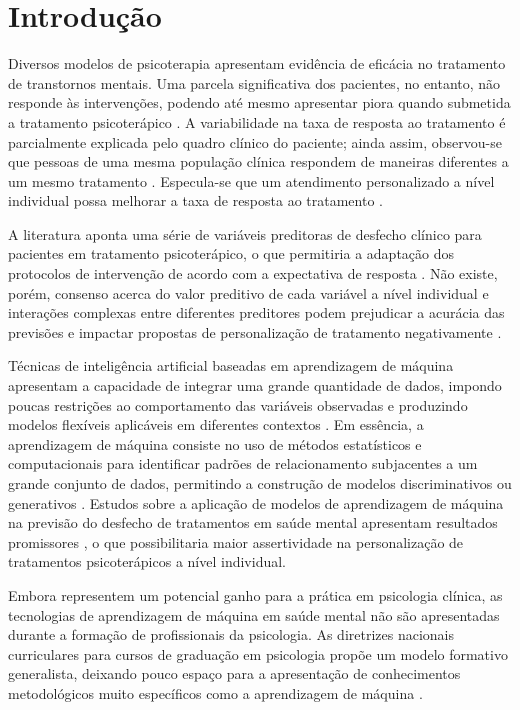 \section{Introdução}

Diversos modelos de psicoterapia apresentam evidência de eficácia no tratamento de transtornos mentais. Uma parcela significativa dos pacientes,
no entanto, não responde às intervenções, podendo até mesmo apresentar piora quando submetida a tratamento psicoterápico \cite{Cuijpers2021}. A
variabilidade na taxa de resposta ao tratamento é parcialmente explicada pelo quadro clínico do paciente; ainda assim, observou-se que pessoas
de uma mesma população clínica respondem de maneiras diferentes a um mesmo tratamento \cite{Hofmann2012}. Especula-se que um atendimento personalizado
a nível individual possa melhorar a taxa de resposta ao tratamento \cite{Norcross2010, Norcross2018}.

A literatura aponta uma série de variáveis preditoras de desfecho clínico para pacientes em tratamento psicoterápico, o que permitiria a adaptação
dos protocolos de intervenção de acordo com a expectativa de resposta \cite{Smagula2019, Andover2020}. Não existe, porém, consenso acerca do valor
preditivo de cada variável a nível individual e interações complexas entre diferentes preditores podem prejudicar a acurácia das previsões e impactar
propostas de personalização de tratamento negativamente \cite{Taubitz2022}.

Técnicas de inteligência artificial baseadas em aprendizagem de máquina apresentam a capacidade de integrar uma grande quantidade de dados, impondo
poucas restrições ao comportamento das variáveis observadas e produzindo modelos flexíveis aplicáveis em diferentes contextos \cite{Dwyer2018}. Em
essência, a aprendizagem de máquina consiste no uso de métodos estatísticos e computacionais para identificar padrões de relacionamento subjacentes
a um grande conjunto de dados, permitindo a construção de modelos discriminativos ou generativos \cite{Roth2018}. Estudos sobre a aplicação de modelos
de aprendizagem de máquina na previsão do desfecho de tratamentos em saúde mental apresentam resultados promissores \cite{Dwyer2018}, o que possibilitaria
maior assertividade na personalização de tratamentos psicoterápicos a nível individual.

Embora representem um potencial ganho para a prática em psicologia clínica, as tecnologias de aprendizagem de máquina em saúde mental não são apresentadas
durante a formação de profissionais da psicologia. As diretrizes nacionais curriculares para cursos de graduação em psicologia propõe um modelo formativo
generalista, deixando pouco espaço para a apresentação de conhecimentos metodológicos muito específicos como a aprendizagem de máquina \cite{CNE2023, Ruda2019}.

